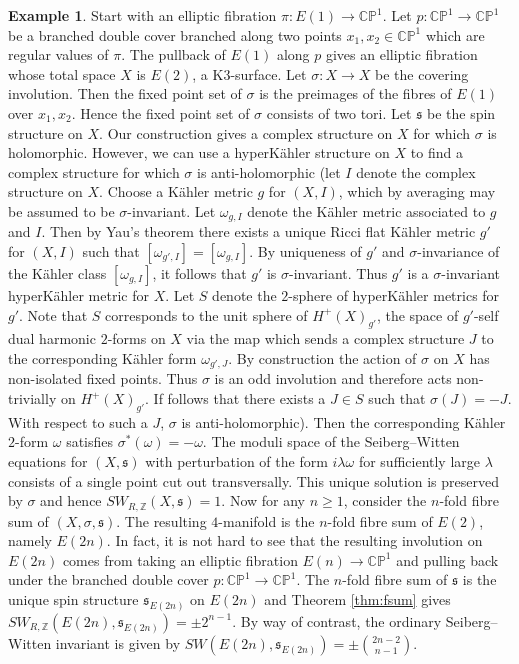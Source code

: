 \documentclass{amsart}
\theoremstyle{definition}
\newtheorem{example}[theorem]{Example}
\theoremstyle{remark}
\numberwithin{equation}{section}
\begin{document}
\begin{example}
Start with an elliptic fibration $\pi : E(1) \to \mathbb{CP}^1$. Let $p : \mathbb{CP}^1 \to \mathbb{CP}^1$ be a branched double cover branched along two points $x_1,x_2 \in \mathbb{CP}^1$ which are regular values of $\pi$. The pullback of $E(1)$ along $p$ gives an elliptic fibration whose total space $X$ is $E(2)$, a K3-surface. Let $\sigma : X \to X$ be the covering involution. Then the fixed point set of $\sigma$ is the preimages of the fibres of $E(1)$ over $x_1,x_2$. Hence the fixed point set of $\sigma$ consists of two tori. Let $\mathfrak{s}$ be the spin structure on $X$. Our construction gives a complex structure on $X$ for which $\sigma$ is holomorphic. However, we can use a hyperK\"ahler structure on $X$ to find a complex structure for which $\sigma$ is anti-holomorphic (let $I$ denote the complex structure on $X$. Choose a K\"ahler metric $g$ for $(X,I)$, which by averaging may be assumed to be $\sigma$-invariant. Let $\omega_{g,I}$ denote the K\"ahler metric associated to $g$ and $I$. Then by Yau's theorem there exists a unique Ricci flat K\"ahler metric $g'$ for $(X,I)$ such that $[\omega_{g',I}] = [\omega_{g,I}]$. By uniqueness of $g'$ and $\sigma$-invariance of the K\"ahler class $[\omega_{g,I}]$, it follows that $g'$ is $\sigma$-invariant. Thus $g'$ is a $\sigma$-invariant hyperK\"ahler metric for $X$. Let $S$ denote the $2$-sphere of hyperK\"ahler metrics for $g'$. Note that $S$ corresponds to the unit sphere of $H^+(X)_{g'}$, the space of $g'$-self dual harmonic $2$-forms on $X$ via the map which sends a complex structure $J$ to the corresponding K\"ahler form $\omega_{g',J}$. By construction the action of $\sigma$ on $X$ has non-isolated fixed points. Thus $\sigma$ is an odd involution and therefore acts non-trivially on $H^+(X)_{g'}$. If follows that there exists a $J \in S$ such that $\sigma(J) = -J$. With respect to such a $J$, $\sigma$ is anti-holomorphic). Then the corresponding K\"ahler $2$-form $\omega$ satisfies $\sigma^*(\omega) = -\omega$. The moduli space of the Seiberg--Witten equations for $(X, \mathfrak{s})$ with perturbation of the form $i \lambda \omega$ for sufficiently large $\lambda$ consists of a single point cut out transversally. This unique solution is preserved by $\sigma$ and hence $SW_{R,\mathbb{Z}}(X , \mathfrak{s}) = 1$. Now for any $n \ge 1$, consider the $n$-fold fibre sum of $(X , \sigma , \mathfrak{s})$. The resulting $4$-manifold is the $n$-fold fibre sum of $E(2)$, namely $E(2n)$. In fact, it is not hard to see that the resulting involution on $E(2n)$ comes from taking an elliptic fibration $E(n) \to \mathbb{CP}^1$ and pulling back under the branched double cover $p : \mathbb{CP}^1 \to \mathbb{CP}^1$. The $n$-fold fibre sum of $\mathfrak{s}$ is the unique spin structure $\mathfrak{s}_{E(2n)}$ on $E(2n)$ and Theorem \ref{thm:fsum} gives $SW_{R , \mathbb{Z}}( E(2n) , \mathfrak{s}_{E(2n)} ) = \pm 2^{n-1}$. By way of contrast, the ordinary Seiberg--Witten invariant is given by $SW(E(2n) , \mathfrak{s}_{E(2n)}) = \pm \binom{2n-2}{n-1}$.

\end{example}
\end{document}
